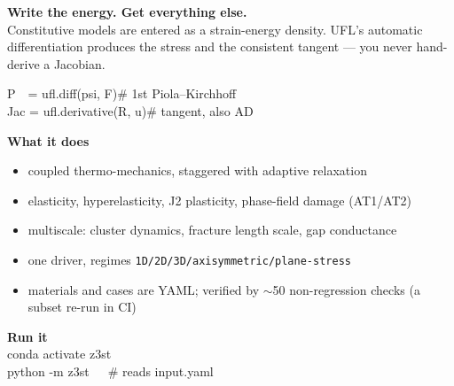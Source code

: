 \documentclass[11pt]{article}
\begin{document}

\vspace{4mm}

\begin{minipage}[t]{0.56\linewidth}
  {\large\bfseries Write the energy. Get everything else.}\\[2mm]
  Constitutive models are entered as a strain-energy density. UFL's automatic
  differentiation produces the stress and the consistent tangent --- you never
  hand-derive a Jacobian.

  \vspace{2mm}
  \colorbox{z3soft}{\parbox{\linewidth}{\ttfamily\small
  \textcolor{z3blue}{P}\ \ = ufl.diff(psi, F)\hfill\textcolor{z3ink!60}{\# 1st Piola--Kirchhoff}\\
  \textcolor{z3blue}{Jac} = ufl.derivative(R, u)\hfill\textcolor{z3ink!60}{\# tangent, also AD}}}

  \vspace{3mm}
  {\bfseries What it does}
  \begin{itemize}[leftmargin=4mm,itemsep=1pt,topsep=2pt]
    \item coupled thermo-mechanics, staggered with adaptive relaxation
    \item elasticity, hyperelasticity, J2 plasticity, phase-field damage (AT1/AT2)
    \item multiscale: cluster dynamics, fracture length scale, gap conductance
    \item one driver, regimes \texttt{1D/2D/3D/axisymmetric/plane-stress}
    \item materials and cases are YAML; verified by $\sim$50 non-regression checks (a subset re-run in CI)
  \end{itemize}

  \vspace{2mm}
  {\bfseries Run it}\\[1mm]
  {\ttfamily\small conda activate z3st\\ python -m z3st\ \ \ \textcolor{z3ink!60}{\# reads input.yaml}}
\end{minipage}\hfill
\end{document}
